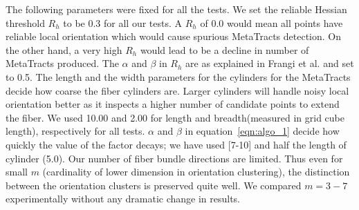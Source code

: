 The following parameters were fixed for all the tests. We set the reliable Hessian threshold $R_{h}$ to be 0.3 for all our tests. A $R_{h}$ of 0.0 would mean all points have reliable local orientation which would cause spurious MetaTracts detection. On the other hand, a very high $ R_{h}$ would lead to be a decline in number of MetaTracts produced. The $\alpha$ and $\beta$ in $R_{h}$ are as explained in Frangi et al. \cite{Frangi1998} and set to 0.5. The length and the width parameters for the cylinders for the MetaTracts decide how coarse the fiber cylinders are. Larger cylinders will handle noisy local orientation better as it inspects a higher number of candidate points to extend the fiber. We used 10.00 and 2.00 for length and breadth(measured in grid cube length), respectively for all tests. $\alpha$ and $\beta$ in equation~\ref{eqn:algo_1} decide how quickly the value of the factor decays; we have used [7-10] and half the length of cylinder (5.0). Our number of fiber bundle directions are limited. Thus even for small $m$ (cardinality of lower dimension in orientation clustering), the distinction between the orientation clusters is preserved quite well. We compared  $m=3-7$ experimentally without any dramatic change in results. 
%

 


